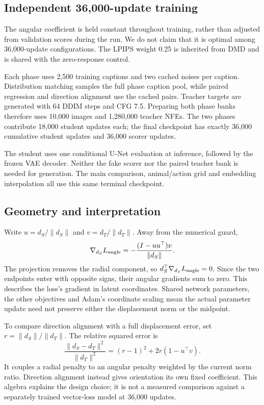 \documentclass[10pt,twocolumn,letterpaper]{article}
\begin{document}
\subsection{Independent 36,000-update training}

The angular coefficient is held constant throughout training, rather than
adjusted from validation scores during the run. We do not claim that it is
optimal among 36,000-update configurations. The LPIPS weight 0.25 is inherited
from DMD and is shared with the zero-response control.

Each phase uses 2,500 training captions and two cached noises per caption.
Distribution matching samples the full phase caption pool, while paired
regression and direction alignment use the cached pairs. Teacher targets
are generated with 64 DDIM steps and CFG 7.5. Preparing both phase banks
therefore uses 10,000 images and 1,280,000 teacher NFEs. The two phases
contribute 18,000 student updates each; the final checkpoint has exactly
36,000 cumulative student updates and 36,000 scorer updates.

The student uses one conditional U-Net evaluation at inference, followed
by the frozen VAE decoder. Neither the fake scorer nor the paired teacher
bank is needed for generation. The main comparison, animal/action grid
and embedding interpolation all use this same terminal checkpoint.


\subsection{Geometry and interpretation}
Write $u=d_S/\|d_S\|$ and $v=d_T/\|d_T\|$. Away from the numerical guard,
\begin{equation}
\nabla_{d_S}L_{\rm angle}
=-\frac{(I-uu^\top)v}{\|d_S\|}.
\end{equation}
The projection removes the radial component, so
$d_S^\top\nabla_{d_S}L_{\rm angle}=0$. Since the two endpoints enter with
opposite signs, their angular gradients sum to zero. This describes the
loss's gradient in latent coordinates. Shared network parameters, the
other objectives and Adam's coordinate scaling mean the actual parameter
update need not preserve either the displacement norm or the midpoint.

To compare direction alignment with a full displacement error, set
$r=\|d_S\|/\|d_T\|$. The relative squared error is
\begin{equation}
\frac{\|d_S-d_T\|^2}{\|d_T\|^2}
=(r-1)^2+2r(1-u^\top v).
\end{equation}
It couples a radial penalty to an angular penalty weighted by the current
norm ratio. Direction alignment instead gives orientation its own fixed
coefficient. This algebra explains the design choice; it is not a measured
comparison against a separately trained vector-loss model at 36,000 updates.
\end{document}
